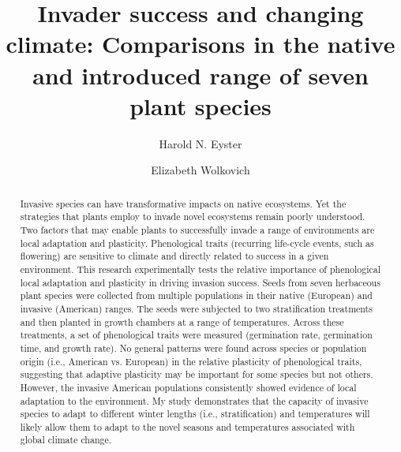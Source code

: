 \documentclass[12pt]{article}\usepackage[]{graphicx}\usepackage[]{color}
\title{Invader success and changing climate: Comparisons in the native and introduced range of seven plant species}
\author[1]{Harold N. Eyster}
\author[2]{Elizabeth Wolkovich}
\affil[1]{Institute for Resources, Environment, and Sustainability, University of British Columbia}
\affil[2]{Department of Forest and Conservation Science, University of British Columbia}
\date{}                     %
\begin{document}
	\maketitle

\begin{spacing}{1} %
	\begin{abstract}
		Invasive species can have transformative impacts on native ecosystems. Yet the strategies that plants employ to invade novel ecosystems remain poorly understood.  Two factors that may enable plants to successfully invade a range of environments are local adaptation and plasticity. Phenological traits (recurring life-cycle events, such as flowering) are sensitive to climate and directly related to success in a given environment. This research experimentally tests the relative importance of phenological local adaptation and plasticity in driving invasion success. Seeds from seven herbaceous plant species were collected from multiple populations in their native (European) and invasive (American) ranges. The seeds were subjected to two stratification treatments and then planted in growth chambers at a range of temperatures. Across these treatments, a set of phenological traits were measured (germination rate, germination time, and growth rate). No general patterns were found across species or population origin (i.e., American vs. European) in the relative plasticity of phenological traits, suggesting that adaptive plasticity may be important for some species but not others. However, the invasive American populations consistently showed evidence of local adaptation to the environment. My study demonstrates that the capacity of invasive species to adapt to different winter lengths (i.e., stratification) and temperatures will likely allow them to adapt to the novel seasons and temperatures associated with global climate change.  
	\end{abstract}
\end{spacing}		
\end{document}
